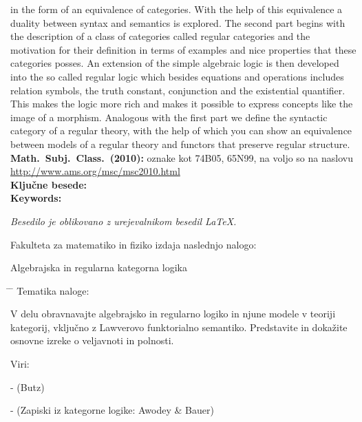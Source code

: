 \documentclass[../kategoricna_logika.tex]{subfiles}
\begin{document}
in the form of an equivalence of categories. With the help of this equivalence a
duality between syntax and semantics is explored.
The second part begins with the description of a class of categories called regular
categories and the motivation for their definition in terms of examples and nice
properties that these categories posses. An extension of the simple algebraic logic is
then developed into the so called regular logic which besides equations and
operations includes relation symbols, the truth constant, conjunction and the
existential quantifier. This makes the logic more rich and makes it possible
to express concepts like the image of a morphism. Analogous with the first part
we define the syntactic category of a regular theory, with the help of which
you can show an equivalence between models of a regular theory and functors that
preserve regular structure.
\vfill\noindent
\textbf{Math.~Subj.~Class.~(2010):} oznake kot 74B05, 65N99, na voljo so na naslovu
\url{http://www.ams.org/msc/msc2010.html} \\[1mm]
\textbf{Ključne besede:} \tkeywords \\[1mm]
\textbf{Keywords:} \tkeywordsEn

\cleardoublepage

\thispagestyle{empty}
\vspace*{8cm}
%
\noindent
%
\begin{center}
\mbox{}\vfill
\emph{Besedilo je oblikovano z urejevalnikom besedil \LaTeX.}
\end{center}
\clearemptydoublepage
%
%
\thispagestyle{empty}
\vspace*{4cm}
%
\noindent
Fakulteta za matematiko in fiziko izdaja naslednjo nalogo:

Algebrajska in regularna kategorna logika

\medskip
\begin{tabbing}
\hspace{32mm}\= \hspace{6cm} \= \kill
%
%
Tematika naloge:
\end{tabbing}
V delu obravnavajte algebrajsko in regularno logiko in njune modele v teoriji kategorij,
vključno z Lawverovo funktorialno semantiko.
Predstavite in dokažite osnovne izreke o veljavnoti in polnosti.


Viri:

- (Butz)

- (Zapiski iz kategorne logike: Awodey \& Bauer)
\vspace{15mm}
%
\vspace{2cm}
%
\clearemptydoublepage
%

%
\end{document}
